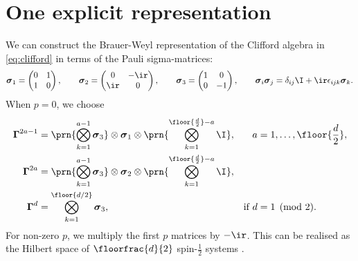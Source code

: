 \documentclass[11pt]{article}
\newcommand{\Gammab}{\boldsymbol{\Gamma}}
\newcommand{\sigmab}{\boldsymbol{\sigma}}
\begin{document}

\section{One explicit representation}\label{sec:explicit}

We can construct the Brauer-Weyl representation \cite{brauer1935spinors} of the Clifford algebra in \cref{eq:clifford} in terms of the Pauli sigma-matrices:
%
\begin{equation}\label{eq:paulisigma}
  \sigmab_1 = \begin{pmatrix}
                0 & 1 \\
                1 & 0 \\
              \end{pmatrix}
  , \qquad
  \sigmab_2 = \begin{pmatrix}
                0   & -\ir \\
                \ir & 0    \\
              \end{pmatrix}
  , \qquad
  \sigmab_3 = \begin{pmatrix}
                1 & 0  \\
                0 & -1 \\
              \end{pmatrix}
  , \qquad
  \sigmab_i \sigmab_j = \delta_{ij} \I + \ir \epsilon_{ijk} \sigmab_k.
\end{equation}
%
When $p=0$, we choose
%
\begin{equation}\label{eq:explicit}
\begin{aligned}
  \Gammab^{2a-1} &= \prn{\bigotimes_{k=1}^{a-1} \sigmab_3}
                    \otimes \sigmab_1 \otimes
                    \prn{\bigotimes_{k=1}^{\floor{\frac{d}{2}}-a} \I}, &
    a &= 1, \ldots, \floor{\frac{d}{2}}, \\
  \Gammab^{2a} &= \prn{\bigotimes_{k=1}^{a-1} \sigmab_3}
                  \otimes \sigmab_2 \otimes
                  \prn{\bigotimes_{k=1}^{\floor{\frac{d}{2}}-a} \I}, \\
  \Gammab^d &= \bigotimes_{k=1}^{\floor{d/2}} \sigmab_3, &
    \text{if }
    d &= 1 \pmod 2.
\end{aligned}
\end{equation}
%
For non-zero $p$, we multiply the first $p$ matrices by $-\ir$.
This can be realised as the Hilbert space of $\floorfrac{d}{2}$ spin-$\frac{1}{2}$ systems
\cite{Strathdee:1987jr,strathdee1986extended}.
\end{document}
